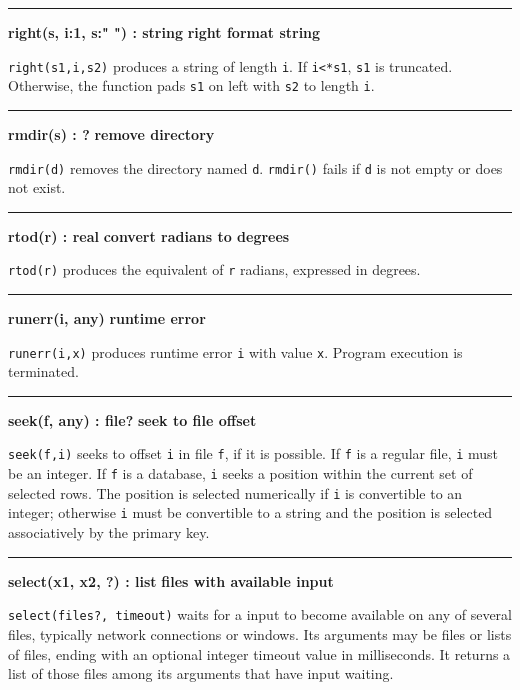\bigskip\hrule\vspace{0.1cm}
\noindent
{\bf right(s, i:1, s:" ") : string } \hfill {\bf right format string}

\noindent
{}\texttt{right(s1,i,s2)} produces a string of length
\texttt{i}. If \texttt{i{\textless}*s1}, \texttt{s1} is truncated.
Otherwise, the function pads \texttt{s1} on left with \texttt{s2} to
length \texttt{i}.

\bigskip\hrule\vspace{0.1cm}
\noindent
{\bf rmdir(s) : ? } \hfill {\bf remove directory}

\noindent
{}\texttt{rmdir(d)} removes the directory named
\texttt{d}. \texttt{rmdir()} fails if \texttt{d} is not empty or does
not exist.

\bigskip\hrule\vspace{0.1cm}
\noindent
{\bf rtod(r) : real } \hfill {\bf convert radians to degrees}

\noindent
{}\texttt{rtod(r)} produces the
equivalent of \texttt{r} radians, expressed in degrees.

\bigskip\hrule\vspace{0.1cm}
\noindent
{\bf runerr(i, any) } \hfill {\bf runtime error}

\noindent
{}\texttt{runerr(i,x)} produces runtime error
\texttt{i} with value \texttt{x}. Program execution is terminated.

\bigskip\hrule\vspace{0.1cm}
\noindent
{\bf seek(f, any) : file? } \hfill {\bf seek to file offset}

\noindent
{}\texttt{seek(f,i)} seeks to offset \texttt{i} in file
\texttt{f}, if it is possible. If \texttt{f} is a regular file,
\texttt{i} must be an integer. If \texttt{f} is a database, \texttt{i}
seeks a position within the current set of selected rows. The position
is selected numerically if \texttt{i} is convertible to an integer;
otherwise \texttt{i} must be convertible to a string and the position
is selected associatively by the primary key.

\bigskip\hrule\vspace{0.1cm}
\noindent
{\bf select(x1, x2, ?) : list } \hfill {\bf files with available input}

\noindent
\texttt{select(files?, timeout)} waits for a input to become available
on any of several files, typically network connections or windows. Its
arguments may be files or lists of files, ending with an optional
integer timeout value in milliseconds. It returns a list of those files
among its arguments that have input waiting.

